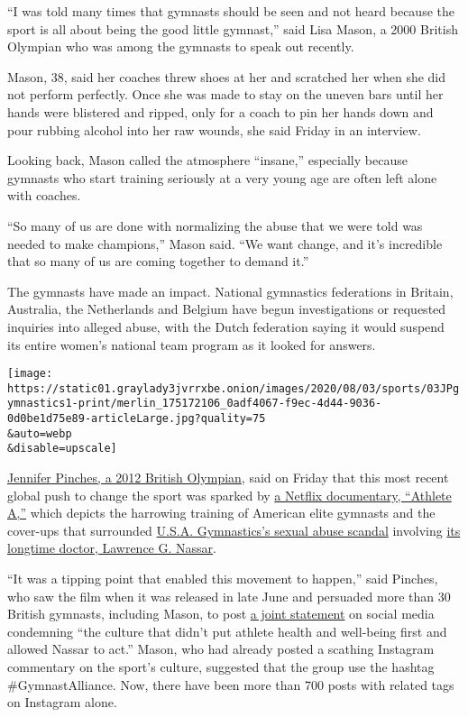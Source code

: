 ``I was told many times that gymnasts should be seen and not heard
because the sport is all about being the good little gymnast,'' said
Lisa Mason, a 2000 British Olympian who was among the gymnasts to speak
out recently.

Mason, 38, said her coaches threw shoes at her and scratched her when
she did not perform perfectly. Once she was made to stay on the uneven
bars until her hands were blistered and ripped, only for a coach to pin
her hands down and pour rubbing alcohol into her raw wounds, she said
Friday in an interview.

Looking back, Mason called the atmosphere ``insane,'' especially because
gymnasts who start training seriously at a very young age are often left
alone with coaches.

``So many of us are done with normalizing the abuse that we were told
was needed to make champions,'' Mason said. ``We want change, and it's
incredible that so many of us are coming together to demand it.''

The gymnasts have made an impact. National gymnastics federations in
Britain, Australia, the Netherlands and Belgium have begun
investigations or requested inquiries into alleged abuse, with the Dutch
federation saying it would suspend its entire women's national team
program as it looked for answers.

\texttt{[image: https://static01.graylady3jvrrxbe.onion/images/2020/08/03/sports/03JPgymnastics1-print/merlin\_175172106\_0adf4067-f9ec-4d44-9036-0d0be1d75e89-articleLarge.jpg?quality=75\\\&auto=webp\\\&disable=upscale]}

\href{https://www.telegraph.co.uk/gymnastics/2020/07/08/culture-fear-permeating-whole-gymnastics-has-stop/}{Jennifer
Pinches, a 2012 British Olympian}, said on Friday that this most recent
global push to change the sport was sparked by
\href{https://www.nytimes3xbfgragh.onion/2020/06/24/movies/athlete-a-review.html}{a
Netflix documentary, ``Athlete A,''} which depicts the harrowing
training of American elite gymnasts and the cover-ups that surrounded
\href{https://www.nytimes3xbfgragh.onion/2020/03/03/sports/olympics/biles-gymnastics-settlement-nassar.html?searchResultPosition=3}{U.S.A.
Gymnastics's sexual abuse scandal} involving
\href{https://www.nytimes3xbfgragh.onion/video/us/100000005698488/larry-nassar-gymnastics-sex-abuse.html?searchResultPosition=7}{its
longtime doctor, Lawrence G. Nassar}.

``It was a tipping point that enabled this movement to happen,'' said
Pinches, who saw the film when it was released in late June and
persuaded more than 30 British gymnasts, including Mason, to post
\href{https://www.instagram.com/p/CCBs9R1DPFh/}{a joint statement} on
social media condemning ``the culture that didn't put athlete health and
well-being first and allowed Nassar to act.'' Mason, who had already
posted a scathing Instagram commentary on the sport's culture, suggested
that the group use the hashtag \#GymnastAlliance. Now, there have been
more than 700 posts with related tags on Instagram alone.

